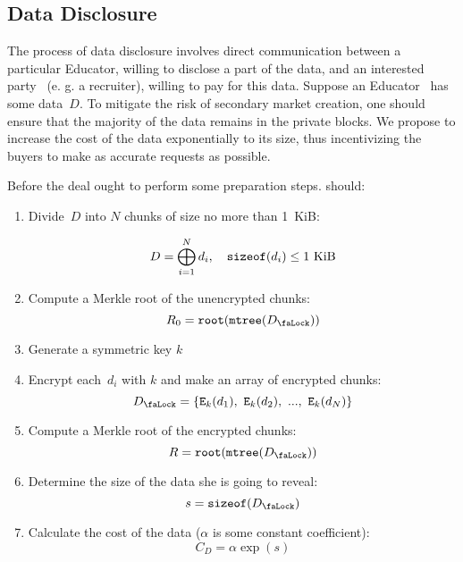 \subsection{Data Disclosure}
\label{sec:DataDisclosure}
The process of data disclosure involves direct communication between a particular Educator, willing to disclose a part of the data, and an interested party~ (e. g. a recruiter), willing to pay for this data. Suppose an Educator~ has some data~$D$. To mitigate the risk of secondary market creation, one should ensure that the majority of the data remains in the private blocks. We propose to increase the cost of the data exponentially to its size, thus incentivizing the buyers to make as accurate requests as possible.

 Before the deal  ought to perform some preparation steps.  should:
\begin{enumerate}
\item Divide~$D$ into $N$ chunks of size no more than 1~KiB:

\begin{equation}
D = \bigoplus_{i=1}^N d_i, \quad \mathtt{sizeof}(d_i) \leq 1~\mathrm{KiB}
\end{equation}

\item Compute a Merkle root of the unencrypted chunks:
\begin{equation}
R_0 = \Root(\MerkleTree(\Lock{D}))
\end{equation}

\item Generate a symmetric key $k$
\item Encrypt each~$d_i$ with $k$ and make an array of encrypted chunks:
\begin{equation}
\Lock{D} = \{ \Encrypt_\Key{k}(d_1),\ \Encrypt_\Key{k}(d_2),\ ...,\ \Encrypt_\Key{k}(d_N) \}
\end{equation}

\item Compute a Merkle root of the encrypted chunks:
\begin{equation}
R = \Root(\MerkleTree(\Lock{D}))
\end{equation}

\item Determine the size of the data she is going to reveal:
\begin{equation}
s = \SizeOf(\Lock{D})
\end{equation}

\item Calculate the cost of the data ($\alpha$ is some constant coefficient):
\begin{equation}
C_D = \alpha \operatorname{exp}(s)
\end{equation}
\end{enumerate}

